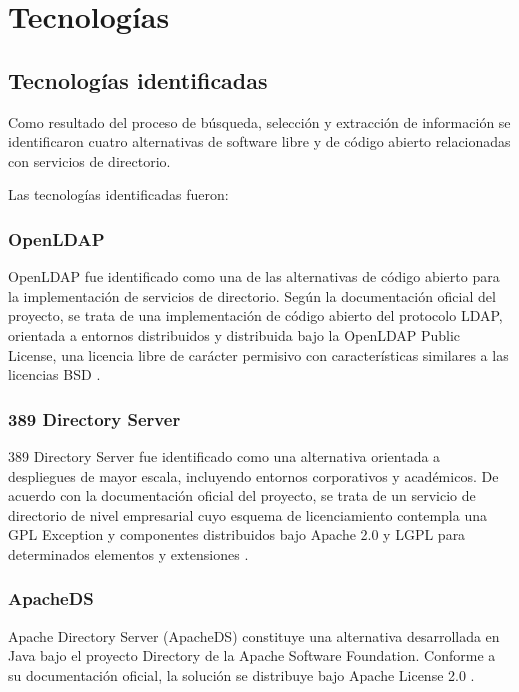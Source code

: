 \section{Tecnologías}\label{sec:tecnologias}

\subsection{Tecnologías identificadas}\label{subsec:tecnologias-identificadas}

Como resultado del proceso de búsqueda, selección y extracción de información se identificaron cuatro alternativas de software libre y de código abierto relacionadas con servicios de directorio.

Las tecnologías identificadas fueron:

\subsubsection{OpenLDAP}

OpenLDAP fue identificado como una de las alternativas de código abierto para la implementación de servicios de directorio. Según la documentación oficial del proyecto, se trata de una implementación de código abierto del protocolo \acs{LDAP}, orientada a entornos distribuidos y distribuida bajo la OpenLDAP Public License, una licencia libre de carácter permisivo con características similares a las licencias \ac{BSD} \citep{OpenLDAP2026}.

\subsubsection{389 Directory Server}

389 Directory Server fue identificado como una alternativa orientada a despliegues de mayor escala, incluyendo entornos corporativos y académicos. De acuerdo con la documentación oficial del proyecto, se trata de un servicio de directorio de nivel empresarial cuyo esquema de licenciamiento contempla una \acs{GPL} Exception y componentes distribuidos bajo Apache 2.0 y \acs{LGPL} para determinados elementos y extensiones \citep{DS3892026}.

\subsubsection{ApacheDS}

Apache Directory Server (ApacheDS) constituye una alternativa desarrollada en Java bajo el proyecto Directory de la Apache Software Foundation. Conforme a su documentación oficial, la solución se distribuye bajo Apache License 2.0 \citep{ApacheDS2026}.

